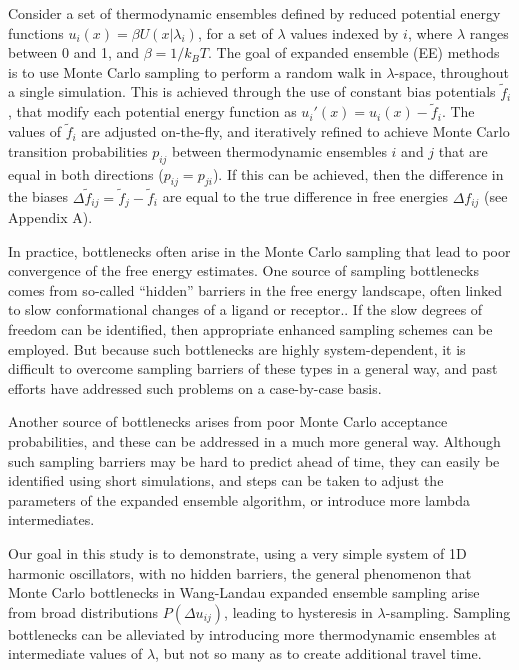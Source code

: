 \documentclass[%
 aip,
rsi,%
 amsmath,amssymb,
 reprint,%
]{revtex4-1}
\begin{document}
Consider a set of thermodynamic ensembles defined by reduced potential energy functions $u_i(x) = \beta U(x|\lambda_i)$, for a set of $\lambda$ values indexed by $i$, where $\lambda$ ranges between 0 and 1, and $\beta = 1/k_BT$.  The goal of expanded ensemble (EE) methods is to use Monte Carlo sampling to perform a random walk in $\lambda$-space, throughout a single simulation.  This is achieved through the use of constant bias potentials $\tilde{f}_i$, that modify each potential energy function as $u_i'(x) = u_i(x) - \tilde{f}_i$. The values of $\tilde{f}_i$ are adjusted on-the-fly, and iteratively refined to achieve Monte Carlo transition probabilities $p_{ij}$ between thermodynamic ensembles $i$ and $j$ that are equal in both directions ($p_{ij} = p_{ji}$).  If this can be achieved, then the difference in the biases $\Delta \tilde{f}_{ij} = \tilde{f}_j - \tilde{f}_i$ are equal to the true difference in free energies $\Delta f_{ij}$ (see Appendix A).

In practice, bottlenecks often arise in the Monte Carlo sampling that lead to poor convergence of the free energy estimates.  One source of sampling bottlenecks comes from so-called ``hidden'' barriers in the free energy landscape, often linked to slow conformational changes of a ligand or receptor.\cite{slow-barriers}.  If the slow degrees of freedom can be identified, then appropriate enhanced sampling schemes can be employed.  But because such bottlenecks are highly system-dependent,  it is difficult to overcome sampling barriers of these types in a general way, and past efforts have addressed such problems on a case-by-case basis.\cite{case-by-case}

Another source of bottlenecks arises from poor Monte Carlo acceptance probabilities, and these can be addressed in a much more general way. Although such sampling barriers may be hard to predict ahead of time, they can easily be identified using short simulations, and steps can be taken to adjust the parameters of the expanded ensemble algorithm, or introduce more lambda intermediates.

Our goal in this study is to demonstrate, using a very simple system of 1D harmonic oscillators, with no hidden barriers, the general phenomenon that Monte Carlo bottlenecks in Wang-Landau expanded ensemble sampling arise from broad distributions $P(\Delta u_{ij})$, leading to hysteresis in $\lambda$-sampling.   Sampling bottlenecks can be alleviated by introducing more thermodynamic ensembles at intermediate values of $\lambda$, but not so many as to create additional travel time.
\end{document}
